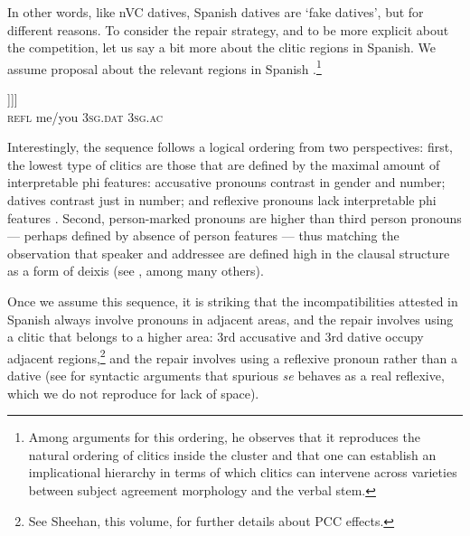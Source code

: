 \documentclass[output=paper,modfonts,nonflat,newtxmath,colorlinks,citecolor=brown]{langsci/langscibook}
\begin{document}
    \z

In other words, like nVC datives, Spanish datives are ‘fake datives’, but for different reasons. To consider the repair strategy, and to be more explicit about the competition, let us say a bit more about the clitic regions in Spanish. We assume \citet{Kayne2010} proposal about the relevant regions in Spanish .\footnote{Among \citet{Kayne2010} arguments for this ordering, he observes that it reproduces the natural ordering of clitics inside the cluster and that one can establish an implicational hierarchy in terms of which clitics can intervene across varieties between subject agreement morphology and the verbal stem.}   

\ea%
    \label{ex:cabre:22}
    \gll  [\textsubscript{WP}  se  [\textsubscript{XP}  me/te  [\textsubscript{YP}  le  [\textsubscript{ZP}  lo ... [vP]]]] \\
    { } \textsc{refl} { } me/you {} \textsc{3sg.dat} { } \textsc{3sg.ac}  \\
    \glt
    \z

        
    
Interestingly, the sequence follows a logical ordering from two perspectives: first, the lowest type of clitics are those that are defined by the maximal amount of interpretable phi features: accusative pronouns contrast in gender and number; datives contrast just in number; and reflexive pronouns lack interpretable phi features \citep{Reuland2011}. Second, person{}-marked pronouns are higher than third person pronouns — perhaps defined by absence of person features — thus matching the observation that speaker and addressee are defined high in the clausal structure as a form of deixis (see \citealt{Giorgi2009}, among many others). 

Once we assume this sequence, it is striking that the incompatibilities attested in Spanish always involve pronouns in adjacent areas, and the repair involves using a clitic that belongs to a higher area: 3rd accusative and 3rd dative occupy adjacent regions,\footnote{See Sheehan, this volume, for further details about PCC effects.} and the repair involves using a reflexive pronoun rather than a dative (see \citealt{Alcaraz2017} for syntactic arguments that spurious \textit{se} behaves as a real reflexive, which we do not reproduce for lack of space).
\end{document}
